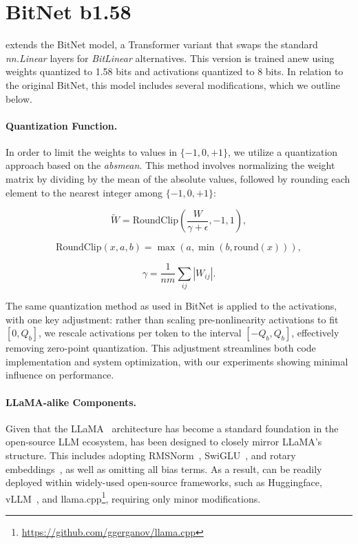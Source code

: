 \section{BitNet b1.58}

 extends the BitNet model, a Transformer variant that swaps the standard \emph{nn.Linear} layers for \emph{BitLinear} alternatives. This version is trained anew using weights quantized to 1.58 bits and activations quantized to 8 bits. In relation to the original BitNet, this model includes several modifications, which we outline below.

\paragraph{Quantization Function.} In order to limit the weights to values in $\{-1, 0, +1\}$, we utilize a quantization approach based on the \emph{absmean}. This method involves normalizing the weight matrix by dividing by the mean of the absolute values, followed by rounding each element to the nearest integer among $\{-1, 0, +1\}$:

\begin{equation}
    \widetilde{W} = \mathrm{RoundClip}(\frac{W}{\gamma + \epsilon}, -1, 1),
\end{equation}

\begin{equation}
    \mathrm{RoundClip}(x, a, b) = \max(a, \min(b, \mathrm{round}(x))),
\end{equation}

\begin{equation}
    \gamma = \frac{1}{nm}\sum_{ij} |W_{ij}|.
\end{equation}

The same quantization method as used in BitNet is applied to the activations, with one key adjustment: rather than scaling pre-nonlinearity activations to fit $[0, Q_b]$, we rescale activations per token to the interval $[-Q_b, Q_b]$, effectively removing zero-point quantization. This adjustment streamlines both code implementation and system optimization, with our experiments showing minimal influence on performance.

\paragraph{LLaMA-alike Components.}

Given that the LLaMA~\cite{llama, llama2} architecture has become a standard foundation in the open-source LLM ecosystem,  has been designed to closely mirror LLaMA's structure. This includes adopting RMSNorm~\cite{rmsnorm}, SwiGLU~\cite{swiglu}, and rotary embeddings~\cite{rope}, as well as omitting all bias terms. As a result,  can be readily deployed within widely-used open-source frameworks, such as Huggingface, vLLM~\cite{vllm}, and llama.cpp\footnote{\url{https://github.com/ggerganov/llama.cpp}}, requiring only minor modifications.

